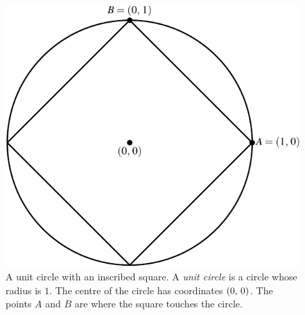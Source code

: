 \documentclass[a4paper,oneside,12pt]{article}
\begin{document}
\begin{figure}[!htbp]
\centering
\includegraphics[scale=1]{image/03/circle-square.pdf}
\caption{%
  A unit circle with an inscribed square.  A \emph{unit circle} is a
  circle whose radius is $1$.  The centre of the circle has
  coordinates $\left\lparen{0},\, {0}\right\rparen$.  The points $A$ and $B$ are where the
  square touches the circle.
}
\label{fig:circle_inscribed_square}
\end{figure}
\end{document}
